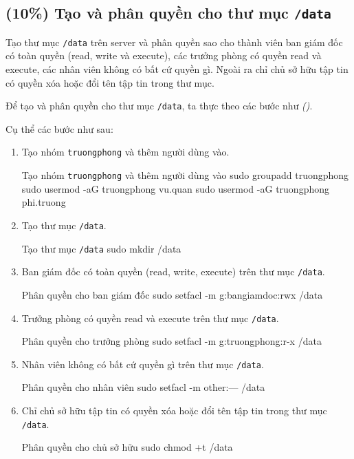 \subsection{(10\%) Tạo và phân quyền cho thư mục \texttt{/data}}

Tạo thư mục \texttt{/data} trên server và phân quyền sao cho thành viên ban
giám đốc có toàn quyền (read, write và execute), các trưởng phòng có quyền read và
execute, các nhân viên không có bất cứ quyền gì. Ngoài ra chỉ chủ sở hữu tập tin có
quyền xóa hoặc đổi tên tập tin trong thư mục.


Để tạo và phân quyền cho thư mục \texttt{/data}, ta thực theo các bước như \textit{()}.





Cụ thể các bước như sau:

\begin{enumerate}
  \item Tạo nhóm \texttt{truongphong} và thêm người dùng vào.\\
        \begin{coding}[gobble=10]{Tạo nhóm \texttt{truongphong} và thêm người dùng vào}
          sudo groupadd truongphong
          sudo usermod -aG truongphong vu.quan
          sudo usermod -aG truongphong phi.truong
        \end{coding}
  \item Tạo thư mục \texttt{/data}.\\
        \begin{coding}[gobble=10]{Tạo thư mục \texttt{/data}}
          sudo mkdir /data
        \end{coding}
  \item Ban giám đốc có toàn quyền (read, write, execute) trên thư mục \texttt{/data}.\\
        \begin{coding}[gobble=10]{Phân quyền cho ban giám đốc}
          sudo setfacl -m g:bangiamdoc:rwx /data
        \end{coding}
  \item Trưởng phòng có quyền read và execute trên thư mục \texttt{/data}.\\
        \begin{coding}[gobble=10]{Phân quyền cho trưởng phòng}
          sudo setfacl -m g:truongphong:r-x /data
        \end{coding}
  \item Nhân viên không có bất cứ quyền gì trên thư mục \texttt{/data}.\\
        \begin{coding}[gobble=10]{Phân quyền cho nhân viên}
          sudo setfacl -m other:--- /data
        \end{coding}
  \item Chỉ chủ sở hữu tập tin có quyền xóa hoặc đổi tên tập tin trong thư mục \texttt{/data}.
        \begin{coding}[gobble=10]{Phân quyền cho chủ sở hữu}
          sudo chmod +t /data
        \end{coding}
\end{enumerate}
